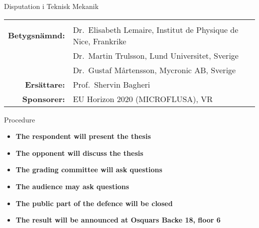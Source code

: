 \begin{frame}[plain]{Disputation i Teknisk Mekanik}
\begin{longtable}[]{@{}rl@{}}
\begin{minipage}[t]{0.72\columnwidth}
  \end{minipage}\tabularnewline
  \begin{minipage}[t]{0.22\columnwidth}\raggedleft
    \textbf{Betygsnämnd:}\strut
  \end{minipage} & \begin{minipage}[t]{0.72\columnwidth}\raggedright
    Dr.~Elisabeth Lemaire, Institut de Physique de Nice, Frankrike\strut
  \end{minipage}\tabularnewline
  \begin{minipage}[t]{0.22\columnwidth}\raggedleft
    \strut
  \end{minipage} & \begin{minipage}[t]{0.72\columnwidth}\raggedright
    Dr.~Martin Trulsson, Lund Universitet, Sverige\strut
  \end{minipage}\tabularnewline
  \begin{minipage}[t]{0.22\columnwidth}\raggedleft
    \strut
  \end{minipage} & \begin{minipage}[t]{0.72\columnwidth}\raggedright
    Dr.~Gustaf M\aa rtensson, Mycronic AB, Sverige\strut
  \end{minipage}\tabularnewline
  \begin{minipage}[t]{0.22\columnwidth}\raggedleft
    \textbf{Ersättare:}\strut
  \end{minipage} & \begin{minipage}[t]{0.72\columnwidth}\raggedright
    Prof.~Shervin Bagheri\strut
  \end{minipage}\tabularnewline
  \begin{minipage}[t]{0.22\columnwidth}\raggedleft
    \textbf{Sponsorer:}\strut
  \end{minipage} & \begin{minipage}[t]{0.72\columnwidth}\raggedright
    EU Horizon 2020 (MICROFLUSA), VR\strut
  \end{minipage}\tabularnewline
  \bottomrule
\end{longtable}
\end{frame}

\begin{frame}[plain]{Procedure}
\protect\hypertarget{procedure}{}
\begin{itemize}
\item
  \textbf{The respondent will present the thesis}
  \medskip
\item
  \textbf{The opponent will discuss the thesis}
  \medskip
\item
  \textbf{The grading committee will ask questions}
  \medskip
\item
  \textbf{The audience may ask questions}
  \medskip
\item
  \textbf{The public part of the defence will be closed}
  \medskip
\item
  \textbf{The result will be announced at Osquars Backe 18, floor 6}
\end{itemize}
\end{frame}
